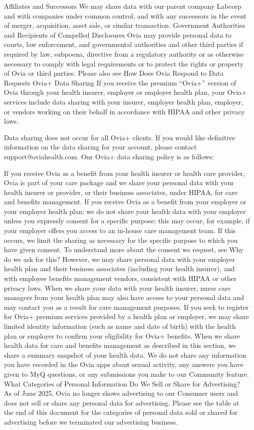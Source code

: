 Affiliates and Successors	We may share data with our parent company Labcorp and with companies under common control, and with any successors in the event of merger, acquisition, asset sale, or similar transaction.
Government Authorities and Recipients of Compelled Disclosures	Ovia may provide personal data to courts, law enforcement, and governmental authorities and other third parties if required by law, subpoena, directive from a regulatory authority or as otherwise necessary to comply with legal requirements or to protect the rights or property of Ovia or third parties.
Please also see How Does Ovia Respond to Data Requests
Ovia+ Data Sharing
If you receive the premium “Ovia+” version of Ovia through your health insurer, employer or employer health plan, your Ovia+ services include data sharing with your insurer, employer health plan, employer, or vendors working on their behalf in accordance with HIPAA and other privacy laws.

Data sharing does not occur for all Ovia+ clients. If you would like definitive information on the data sharing for your account, please contact support@oviahealth.com. Our Ovia+ data sharing policy is as follows:

If you receive Ovia as a benefit from your health insurer or health care provider, Ovia is part of your care package and we share your personal data with your health insurer or provider, or their business associates, under HIPAA, for care and benefits management.
If you receive Ovia as a benefit from your employer or your employer health plan:
we do not share your health data with your employer unless you expressly consent for a specific purpose; this may occur, for example, if your employer offers you access to an in-house care management team. If this occurs, we limit the sharing as necessary for the specific purpose to which you have given consent. To understand more about the consent we request, see Why do we ask for this?
However, we may share personal data with your employer health plan and their business associates (including your health insurer), and with employee benefits management vendors, consistent with HIPAA or other privacy laws.
When we share your data with your health insurer, nurse care managers from your health plan may also have access to your personal data and may contact you as a result for care management purposes.
If you seek to register for Ovia+ premium services provided by a health plan or employer, we may share limited identity information (such as name and date of birth) with the health plan or employer to confirm your eligibility for Ovia+ benefits.
When we share health data for care and benefits management as described in this section, we share a summary snapshot of your health data. We do not share any information you have recorded in the Ovia apps about sexual activity, any answers you have given to MyQ questions, or any submissions you make to our Community feature.
What Categories of Personal Information Do We Sell or Share for Advertising?
As of June 2025, Ovia no longer shows advertising to our Consumer users and does not sell or share any personal data for advertising. Please see the table at the end of this document for the categories of personal data sold or shared for advertising before we terminated our advertising business.

